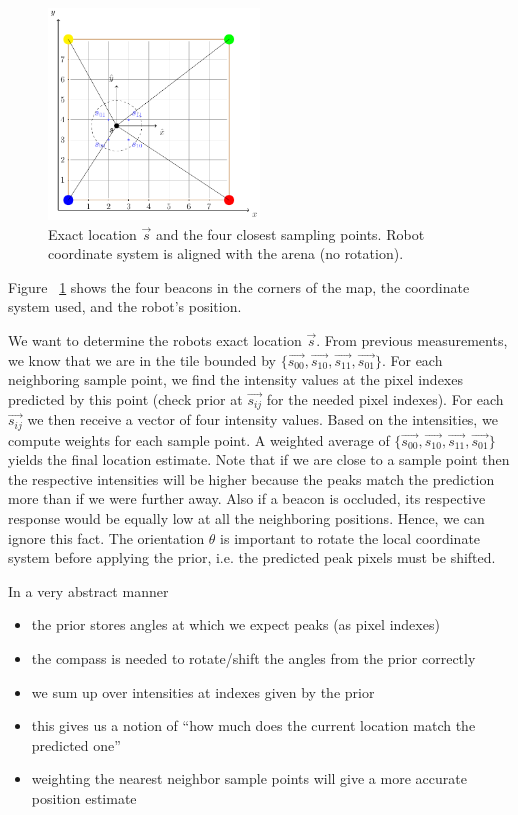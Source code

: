 \begin{figure}[H]
\centering
\includegraphics[width=0.5\textwidth]{figures/fig_localization_grid.pdf}
\caption{Exact location $\vec{s}$ and the four closest sampling points. Robot coordinate system is aligned with the arena (no rotation).}
\label{fig:localization_grid}
\end{figure}

Figure \figurename~\ref{fig:localization_grid} shows the four beacons in the corners of the map, the coordinate system used, and the robot's position.

We want to determine the robots exact
location $\vec{s}$. From previous measurements, we know that we are in the tile
bounded by $\{\vec{s_{00}},\vec{s_{10}},\vec{s_{11}},\vec{s_{01}}\}$. For each 
neighboring sample point, we find the intensity values at the pixel indexes 
predicted by this point (check prior at $\vec{s_{ij}}$ for the needed pixel indexes).
For each $\vec{s_{ij}}$ we then receive a vector of four intensity values. 
Based on the intensities, we compute weights for each sample point. A weighted 
average of  $\{\vec{s_{00}},\vec{s_{10}},\vec{s_{11}},\vec{s_{01}}\}$ yields the
final location estimate.
Note that if we are 
close to a sample point then the respective intensities will be higher because the
peaks match the prediction more than if we were further away. Also if a beacon is
occluded, its respective response would be equally low at all the neighboring  
positions. Hence, we can ignore this fact.
The orientation $\theta$ is important to rotate the local coordinate system before
applying the prior, i.e. the predicted peak pixels must be shifted.

In a very abstract manner 
\begin{itemize}
    \item the prior stores angles at which we expect peaks (as pixel indexes)
    \item the compass is needed to rotate/shift the angles from the prior correctly
    \item we sum up over intensities at indexes given by the prior
    \item this gives us a notion of ``how much does the current location match the predicted one''
    \item weighting the nearest neighbor sample points will give a more accurate
    position estimate
\end{itemize}



